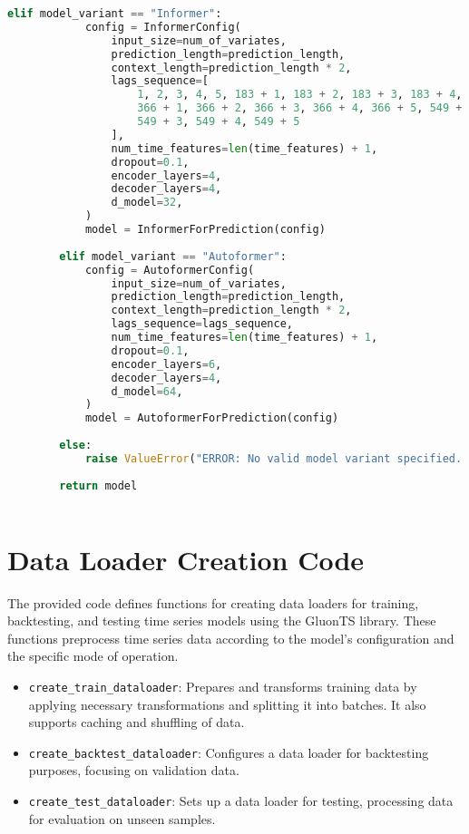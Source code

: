 \begin{lstlisting}[language=Python, caption={Code for defining the architecture and hyperparameters of the forecasting model}, breaklines=true, label=code3]
        elif model_variant == "Informer":
            config = InformerConfig(
                input_size=num_of_variates,
                prediction_length=prediction_length,
                context_length=prediction_length * 2,
                lags_sequence=[
                    1, 2, 3, 4, 5, 183 + 1, 183 + 2, 183 + 3, 183 + 4, 183 + 5,
                    366 + 1, 366 + 2, 366 + 3, 366 + 4, 366 + 5, 549 + 1, 549 + 2,
                    549 + 3, 549 + 4, 549 + 5
                ],
                num_time_features=len(time_features) + 1,
                dropout=0.1,
                encoder_layers=4,
                decoder_layers=4,
                d_model=32,
            )
            model = InformerForPrediction(config)
    
        elif model_variant == "Autoformer":
            config = AutoformerConfig(
                input_size=num_of_variates,
                prediction_length=prediction_length,
                context_length=prediction_length * 2,
                lags_sequence=lags_sequence,
                num_time_features=len(time_features) + 1,
                dropout=0.1,
                encoder_layers=6,
                decoder_layers=4,
                d_model=64,
            )
            model = AutoformerForPrediction(config)
    
        else:
            raise ValueError("ERROR: No valid model variant specified. Choose 'Transformer', 'Informer', or 'Autoformer'.")
    
        return model
    

\end{lstlisting}

\section{Data Loader Creation Code}

The provided code defines functions for creating data loaders for training, backtesting, and testing time series models using the GluonTS library. These functions preprocess time series data according to the model's configuration and the specific mode of operation.

\begin{itemize}
    \item \texttt{create\_train\_dataloader}: Prepares and transforms training data by applying necessary transformations and splitting it into batches. It also supports caching and shuffling of data.
    \item \texttt{create\_backtest\_dataloader}: Configures a data loader for backtesting purposes, focusing on validation data.
    \item \texttt{create\_test\_dataloader}: Sets up a data loader for testing, processing data for evaluation on unseen samples.
\end{itemize}

